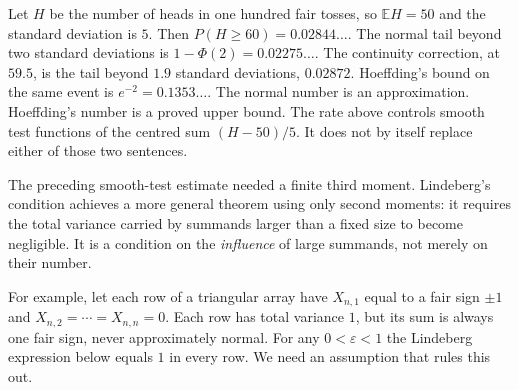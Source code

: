 Let $H$ be the number of heads in one hundred fair tosses, so $\mathbb EH=50$ and the standard deviation is $5$. Then $P(H\ge 60)=0.02844\ldots$. The normal tail beyond two standard deviations is $1-\Phi(2)=0.02275\ldots$. The continuity correction, at $59.5$, is the tail beyond $1.9$ standard deviations, $0.02872$. Hoeffding's bound on the same event is $e^{-2}=0.1353\ldots$. The normal number is an approximation. Hoeffding's number is a proved upper bound. The rate above controls smooth test functions of the centred sum $(H-50)/5$. It does not by itself replace either of those two sentences.

The preceding smooth-test estimate needed a finite third moment. Lindeberg's condition achieves a more general theorem using only second moments: it requires the total variance carried by summands larger than a fixed size to become negligible. It is a condition on the \emph{influence} of large summands, not merely on their number.

For example, let each row of a triangular array have $X_{n,1}$ equal to a fair sign $\pm1$ and $X_{n,2}=\cdots=X_{n,n}=0$. Each row has total variance $1$, but its sum is always one fair sign, never approximately normal. For any $0<\varepsilon<1$ the Lindeberg expression below equals $1$ in every row. We need an assumption that rules this out.

